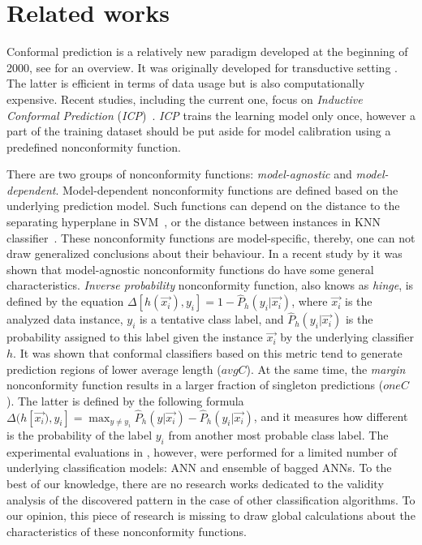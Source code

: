 \section{Related works}
\label{sec:literature}

Conformal prediction is a relatively new paradigm developed at the beginning of
2000, see \cite{linusson2021nonconformity} for an overview. It was originally developed for 
transductive setting \citep{vovk2013transductive}. The latter is efficient in terms of 
data usage but is also computationally expensive. Recent studies, including
the current one, focus on \textit{Inductive Conformal Prediction} 
(\textit{ICP})~\citep{papadopoulos2008inductive}. \textit{ICP} trains the 
learning model only once, however a part of the training dataset should be put
aside for model calibration using a predefined nonconformity function.

There are two groups of nonconformity functions: \textit{model-agnostic} and 
\textit{model-dependent}. Model-dependent nonconformity functions are defined
based on the underlying prediction model. Such functions can depend on the
distance to the separating hyperplane in SVM~\citep{balasubramanian2009support}, 
or the distance between instances in KNN classifier~\citep{proedrou2002transductive}.
These nonconformity functions are model-specific, thereby, one can not draw 
generalized conclusions about their behaviour. In a recent study by 
\cite{johansson2017model} it was shown that model-agnostic nonconformity 
functions do have some general characteristics. \textit{Inverse probability} 
nonconformity function, also knows as \textit{hinge}, is defined by the
equation $\Delta \left[ h (\vec{x_i}), y_i \right] = 1 - \hat{P}_h(y_i | \vec{x_i})$, where 
$\vec{x_i}$ is the analyzed data instance, $y_i$ is a tentative class label, and
$\hat{P}_h(y_i | \vec{x_i})$ is the probability assigned to this label given the 
instance $\vec{x_i}$ by the underlying classifier $h$. It was shown that 
conformal classifiers based on this metric tend to generate prediction regions
of lower average length ($avgC$). At the same time, the \textit{margin} 
nonconformity function results in a larger fraction of singleton predictions
($oneC$). The latter is defined by the following formula 
$\Delta ( h \left[\vec{x_i}), y_i\right] = \max_{y \neq y_i}\hat{P}_h(y | \vec{x_i}) - \hat{P}_h(y_i | \vec{x_i})$,
and it measures how different is the probability of the label $y_i$ from 
another most probable class label. The experimental evaluations in \citep{johansson2017model}, 
however, were performed for a limited number of underlying classification models:
ANN and ensemble of bagged ANNs. To the best of our knowledge, there are no
research works dedicated to the validity analysis of the discovered pattern in the case
of other classification algorithms. To our opinion, this piece of research is
missing to draw global calculations about the characteristics of these 
nonconformity functions.

